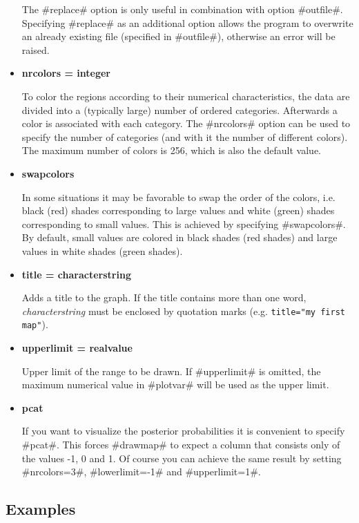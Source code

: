 \begin{itemize}
The #replace# option is only useful in combination with option
#outfile#. Specifying #replace# as an additional option allows the
program to overwrite an already existing file (specified in
#outfile#), otherwise an error will be raised. \item {\bf nrcolors
= integer}

To color the regions according to their numerical characteristics,
the data are divided into a (typically large) number of ordered
categories. Afterwards a color is associated with each category.
The #nrcolors# option can be used to specify the number of
categories (and with it the number of different colors). The
maximum number of colors is 256, which is also the default value.
\item {\bf swapcolors}

In some situations it may be favorable to swap the order of the
colors, i.e. black (red) shades corresponding to large values and
white (green) shades corresponding to small values. This is
achieved by specifying #swapcolors#. By default, small values are
colored in black shades (red shades) and large values in white
shades (green shades). \item {\bf title = characterstring}

Adds a title to the graph. If the title contains more than one
word, {\em characterstring} must be enclosed by quotation marks (e.g.
\texttt{title="my first map"}). \item {\bf upperlimit = realvalue}

Upper limit of the range to be drawn. If #upperlimit# is omitted,
the maximum numerical value in #plotvar# will be used as the
upper limit. \item {\bf pcat}

If you want to visualize the posterior probabilities it is
convenient to specify #pcat#. This forces #drawmap# to expect a
column that consists only of the values -1, 0 and 1. Of course you
can achieve the same result by setting #nrcolors=3#,
#lowerlimit=-1# and #upperlimit=1#.
\end{itemize}


\subsection*{Examples}

